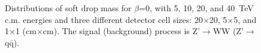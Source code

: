 \begin{figure}
\begin{center}
{   }

\end{center}
\caption{Distributions of soft drop mass for $\beta$=0, with 5, 10, 20, and 
40~TeV c.m. energies and three different detector cell sizes: 20$\times$20, 
5$\times$5, and 1$\times$1 (cm$\times$cm). The signal (background) process is 
Z'$\rightarrow$WW (Z'$\rightarrow$q$\bar{\mathrm{q}}$).
\label{fig:cluster_mass_mmdt_ww}}
\end{figure}


